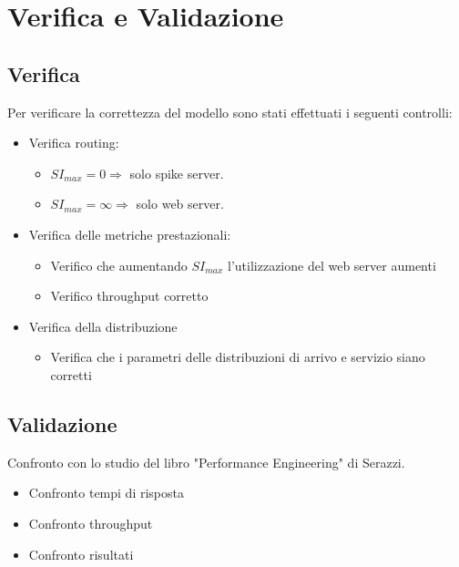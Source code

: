 \section{Verifica e Validazione}
\subsection{Verifica}
\begin{frame}{\subsecname}
    Per verificare la correttezza del modello sono stati effettuati i seguenti controlli:
    \begin{itemize}
        \item Verifica routing:
        \begin{itemize}
            \item \(SI_{max}=0 \Rightarrow\) solo spike server.
            \item \(SI_{max}=\infty \Rightarrow\) solo web server.
        \end{itemize}
        \item Verifica delle metriche prestazionali:
        \begin{itemize}
            \item Verifico che aumentando \(SI_{max}\) l'utilizzazione del web server aumenti
            \item Verifico throughput corretto
        \end{itemize}
        \item Verifica della distribuzione
        \begin{itemize}
            \item Verifica che i parametri delle distribuzioni di arrivo e servizio siano corretti
        \end{itemize}
    \end{itemize}
\end{frame}

\subsection{Validazione}
\begin{frame}{\subsecname}
    Confronto con lo studio del libro "Performance Engineering" di Serazzi.
    \begin{itemize}
        \item Confronto tempi di risposta
        \item Confronto throughput
        \item Confronto risultati
    \end{itemize}
\end{frame}
    
        